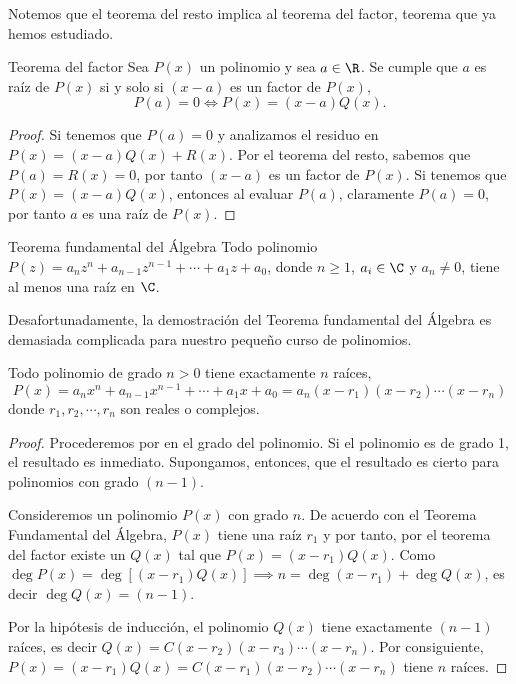 Notemos que el teorema del resto implica al teorema del factor, teorema que ya hemos estudiado.

\begin{theorem.tcb}{Teorema del factor}{}
    Sea $P(x)$ un polinomio y sea $a \in \R$.
    Se cumple que $a$ es raíz de $P(x)$ si y solo si $(x - a)$ es un factor de $P(x)$, \ie
    \[
        P(a) = 0 \iff P(x) = (x - a)Q(x).
    \]
\end{theorem.tcb}
\begin{proof}
    Si tenemos que $P(a) = 0$ y analizamos el residuo en $P(x) = (x - a)Q(x) + R(x)$.
    Por el teorema del resto, sabemos que $P(a) = R(x) = 0$, por tanto $(x - a)$ es un factor de $P(x)$.
    Si tenemos que $P(x) = (x - a)Q(x)$, entonces al evaluar $P(a)$, claramente $P(a) = 0$, por tanto $a$ es una raíz de $P(x)$.
\end{proof}

\begin{theorem.tcb}{Teorema fundamental del Álgebra}{}
    Todo polinomio $P(z) = a_n z^n + a_{n - 1} z^{n - 1} + \cdots + a_1 z + a_0$, donde $n \geq 1$, $a_i \in \C$ y $a_n \neq 0$, tiene al menos una raíz en $\C$.
\end{theorem.tcb}

Desafortunadamente, la demostración del Teorema fundamental del Álgebra es demasiada complicada para nuestro pequeño curso de polinomios.

\begin{theorem.tcb}{}{}
    Todo polinomio de grado $n > 0$ tiene exactamente $n$ raíces, \ie
    \[
        P(x) = a_n x^n + a_{n - 1} x^{n - 1} + \cdots  + a_1 x + a_0 = a_n (x - r_1)(x - r_2) \cdots (x - r_n)
    \]
    donde $r_1, r_2, \cdots, r_n$ son reales o complejos.
\end{theorem.tcb}
\begin{proof}
    Procederemos por  en el grado del polinomio.
    Si el polinomio es de grado 1, el resultado es inmediato.
    Supongamos, entonces, que el resultado es cierto para polinomios con grado $(n - 1)$.

    Consideremos un polinomio $P(x)$ con grado $n$.
    De acuerdo con el Teorema Fundamental del Álgebra, $P(x)$ tiene una raíz $r_1$ y por tanto, por el teorema del factor existe un $Q (x)$ tal que $P(x) = (x - r_1)Q(x)$.
    Como $\deg P(x) = \deg[(x - r_1)Q(x)] \implies n = \deg(x - r_1) + \deg Q(x)$, es decir $\deg Q(x) = (n - 1)$.

    Por la hipótesis de inducción, el polinomio $Q(x)$ tiene exactamente $(n - 1)$ raíces, es decir $Q(x) = C(x - r_2)(x - r_3)\cdots(x - r_n)$.
    Por consiguiente, $P(x) = (x - r_1)Q(x) = C(x - r_1)(x - r_2)\cdots(x - r_n)$ tiene $n$ raíces.
\end{proof}

